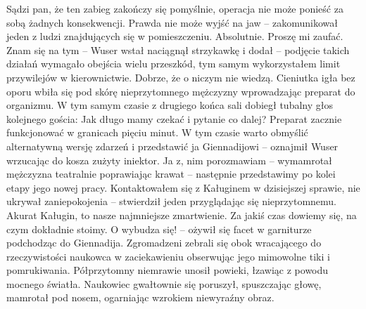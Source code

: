 \documentclass[../MAIN.tex]{subfiles}
\begin{document}
% 
\sx Sądzi pan, że ten zabieg zakończy się pomyślnie, operacja nie może ponieść za sobą żadnych konsekwencji. Prawda nie może wyjść na jaw -- zakomunikował jeden z ludzi znajdujących się w pomieszczeniu. 
\xx Absolutnie. Proszę mi zaufać. Znam się na tym -- Wuser wstał naciągnął strzykawkę i dodał -- podjęcie takich działań wymagało obejścia wielu przeszkód, tym samym wykorzystałem limit przywilejów w kierownictwie. Dobrze, że o niczym nie wiedzą. 
\qd
Cieniutka igła bez oporu wbiła się pod skórę nieprzytomnego mężczyzny wprowadzając preparat do organizmu. W tym samym czasie z drugiego końca sali dobiegł tubalny głos kolejnego gościa: 
% 
\sx Jak długo mamy czekać i pytanie co dalej? 
\xx Preparat zacznie funkcjonować w granicach pięciu minut. W tym czasie warto obmyślić alternatywną wersję zdarzeń i przedstawić ja Giennadijowi -- oznajmił Wuser wrzucając do kosza zużyty iniektor. 
\xx Ja z, nim porozmawiam -- wymamrotał mężczyzna teatralnie poprawiając krawat -- następnie przedstawimy po kolei etapy jego nowej pracy. 
\xx Kontaktowałem się z Kaługinem w dzisiejszej sprawie, nie ukrywał zaniepokojenia -- stwierdził jeden przyglądając się nieprzytomnemu. 
\xx Akurat Kaługin, to nasze najmniejsze zmartwienie. Za jakiś czas dowiemy się, na czym dokładnie stoimy. O wybudza się! -- ożywił się facet w garniturze podchodząc do Giennadija.
\qd
Zgromadzeni zebrali się obok wracającego do rzeczywistości naukowca w zaciekawieniu obserwując jego mimowolne tiki i pomrukiwania. Półprzytomny niemrawie unosił powieki, łzawiąc z powodu mocnego światła. Naukowiec gwałtownie się poruszył, spuszczając głowę, mamrotał pod nosem, ogarniając wzrokiem niewyraźny obraz. 
\end{document}
